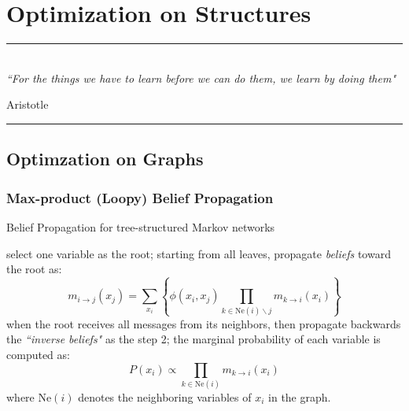 
\chapter{Optimization on Structures} %
\label{Chapter5} %



\rule{\textwidth}{0.4pt} \\[0.5cm]
\textit{``For the things we have to learn before we can do them, we learn by doing them"}

\begin{flushright}
Aristotle
\end{flushright}
\rule{\textwidth}{0.4pt} 

\section{Optimzation on Graphs}

\subsection{Max-product (Loopy) Belief Propagation}
\begin{algorithm}
	\caption{Belief Propagation for tree-structured Markov networks}
	\label{alg:BP_tree}
\begin{algorithmic}[1]
\STATE  select one variable as the root; 
\STATE  starting from all leaves, propagate \emph{beliefs} toward the root as:
\begin{equation*}
m_{i \rightarrow j}(x_j)= \sum_{x_i}\left\{\phi(x_i,x_j) \prod_{k\in \text{Ne}(i)\backslash j} m_{k \rightarrow i}(x_i)\right\}
\end{equation*}
\STATE  when the root receives all messages from its neighbors, then propagate backwards the \emph{``inverse beliefs"} as the step 2;
\STATE  the marginal probability of each variable is computed as: 
\begin{equation*}
P(x_i)\propto \prod_{k\in \text{Ne}(i)} m_{k \rightarrow i}(x_i)
\end{equation*}
where Ne$(i)$ denotes the neighboring variables of $x_i$ in the graph. 
\end{algorithmic}
\end{algorithm}

